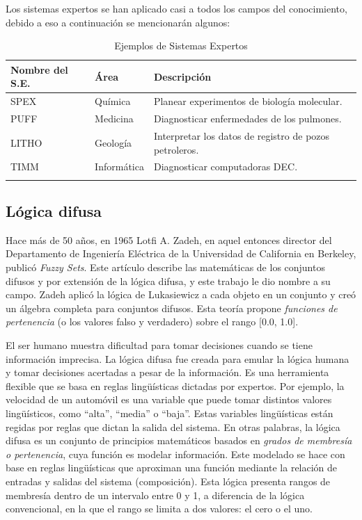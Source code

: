 Los sistemas expertos se han aplicado casi a todos los campos del conocimiento, debido a eso a continuación se mencionarán algunos:


\begin{longtable}[c]{lll} \toprule
	Nombre del S.E.& Área & Descripción\\\midrule
	SPEX & Química & Planear experimentos de biología molecular. \\
	PUFF & Medicina & Diagnosticar enfermedades de los pulmones. \\
	LITHO & Geología & Interpretar los datos de registro de pozos petroleros.\\
	TIMM & Informática & Diagnosticar computadoras DEC.\\\bottomrule
	\caption{Ejemplos de Sistemas Expertos}
\end{longtable}


\subsection{Lógica difusa}\label{seccion:logicadifusa}
Hace más de 50 años, en 1965 Lotfi A. Zadeh, en aquel entonces director del Departamento de Ingeniería Eléctrica de la
Universidad de California en Berkeley, publicó \emph{Fuzzy Sets}. Este artículo describe las matemáticas de los
conjuntos difusos y por extensión de la lógica difusa, y este trabajo le dio nombre a su campo. Zadeh
aplicó la lógica de Lukasiewicz a cada objeto en un conjunto y creó un álgebra completa para conjuntos
difusos. Esta teoría propone \emph{funciones de pertenencia} (o los valores falso y verdadero) sobre el rango
[0.0, 1.0]. 

El ser humano muestra dificultad para tomar decisiones cuando
se tiene información imprecisa. La lógica difusa fue creada para emular la lógica humana y tomar decisiones
acertadas a pesar de la información. Es una herramienta flexible que se basa en reglas lingüísticas
dictadas por expertos. Por ejemplo, la velocidad de un automóvil es una variable que puede tomar distintos
valores lingüísticos, como “alta”, “media” o “baja”. Estas variables lingüísticas están regidas por
reglas que dictan la salida del sistema.
En otras palabras, la lógica difusa es un conjunto de principios matemáticos basados en \emph{grados de
membresía o pertenencia}, cuya función es modelar información. Este modelado se hace con base en
reglas lingüísticas que aproximan una función mediante la relación de entradas y salidas del sistema
(composición). Esta lógica presenta rangos de membresía dentro de un intervalo entre 0 y 1, a diferencia
de la lógica convencional, en la que el rango se limita a dos valores: el cero o el uno.




